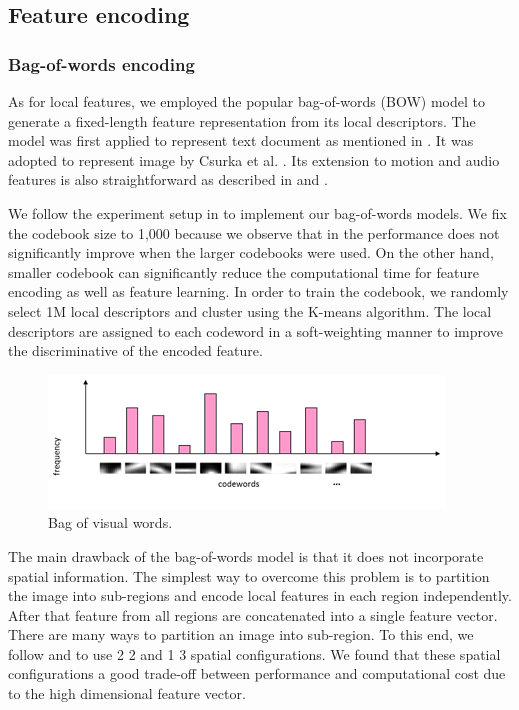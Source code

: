 \documentclass[twocolumn]{bmcart}%
\begin{document}
\subsection{Feature encoding}
\label{feature_encoding}
\subsubsection{Bag-of-words encoding}

As for local features, we employed the popular bag-of-words (BOW) model to generate a fixed-length feature representation from its local descriptors. The model was first applied to represent text document as mentioned in \cite{harris1954distributional}. It was adopted to represent image by Csurka et al. \cite{csurka2004visual}. Its extension to motion and audio features is also straightforward as described in \cite{sivic2009efficient} and \cite{jiang2010columbia}. 

We follow the experiment setup in \cite{jiang2010representations} to implement our bag-of-words models. We fix the codebook size to 1,000 because we observe that in \cite{jiang2010representations} the performance does not significantly improve when the larger codebooks were used. On the other hand, smaller codebook can significantly reduce the computational time for feature encoding as well as feature learning. In order to train the codebook, we randomly select 1M local descriptors and cluster using the K-means algorithm. The local descriptors are assigned to each codeword in a soft-weighting manner \cite{jiang2007towards} to improve the discriminative of the encoded feature.
\begin{figure}[!h]
	\centering
	\includegraphics[width=1\linewidth]{Images/Bow.png}
	\caption{Bag of visual words.}
	\label{fig:bow}
\end{figure}

The main drawback of the bag-of-words model is that it does not incorporate spatial information. The simplest way to overcome this problem is to partition the image into sub-regions and encode local features in each region independently. After that feature from all regions are concatenated into a single feature vector. There are many ways to partition an image into sub-region. To this end, we follow \cite{jiang2010representations} and \cite{lazebnik2006beyond} to use 2  2 and 1  3 spatial configurations. We found that these spatial configurations a good trade-off between performance and computational cost due to the high dimensional feature vector.
\end{document}
